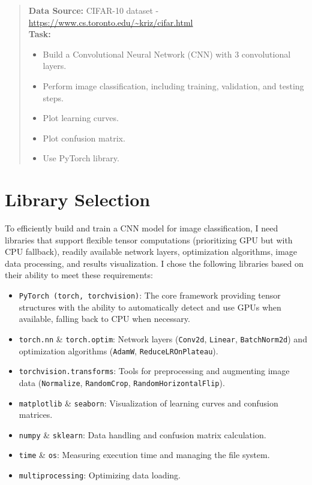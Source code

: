 \documentclass[12pt, a4paper, openany]{report}
\begin{document}
 \begin{abstract}
 \noindent \textbf{Data Source:} CIFAR-10 dataset - \url{https://www.cs.toronto.edu/~kriz/cifar.html} \\ %
 \textbf{Task:} %
 \begin{itemize}
     \item Build a Convolutional Neural Network (CNN) with 3 convolutional layers. %
     \item Perform image classification, including training, validation, and testing steps. %
     \item Plot learning curves. %
     \item Plot confusion matrix. %
     \item Use PyTorch library. %
 \end{itemize}
 \end{abstract}
 \clearpage

 \chapter{Library Selection} %
 To efficiently build and train a CNN model for image classification, I need libraries that support flexible tensor computations (prioritizing GPU but with CPU fallback), readily available network layers, optimization algorithms, image data processing, and results visualization.
 I chose the following libraries based on their ability to meet these requirements:
 \begin{itemize}
     \item \texttt{PyTorch (torch, torchvision)}: The core framework providing tensor structures with the ability to automatically detect and use GPUs when available, falling back to CPU when necessary. %
     \item \texttt{torch.nn} \& \texttt{torch.optim}: Network layers (\texttt{Conv2d}, \texttt{Linear}, \texttt{BatchNorm2d}) and optimization algorithms (\texttt{AdamW}, \texttt{ReduceLROnPlateau}). %
     \item \texttt{torchvision.transforms}: Tools for preprocessing and augmenting image data (\texttt{Normalize}, \texttt{RandomCrop}, \texttt{RandomHorizontalFlip}). %
     \item \texttt{matplotlib} \& \texttt{seaborn}: Visualization of learning curves and confusion matrices. %
     \item \texttt{numpy} \& \texttt{sklearn}: Data handling and confusion matrix calculation. %
     \item \texttt{time} \& \texttt{os}: Measuring execution time and managing the file system. %
     \item \texttt{multiprocessing}: Optimizing data loading. %
 \end{itemize}
\end{document}
